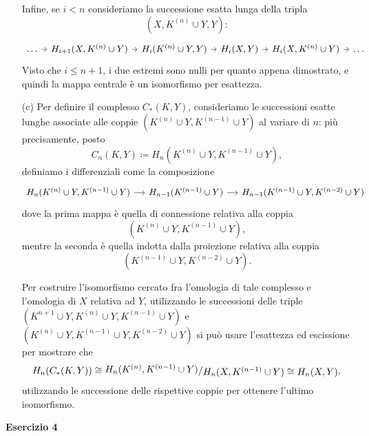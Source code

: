 \documentclass[a4paper]{article}
\newcommand{\ssfrac}[2]{
	\raisebox{+0.3ex}{$#1$}
	/
	\raisebox{-0.3ex}{$#2$}
}
\theoremstyle{definition}
\theoremstyle{definition}
\theoremstyle{remark}
\theoremstyle{definition}
\begin{document}
\begin{itemize}
    Infine, se $i<n$ consideriamo la successione esatta lunga della tripla \[(X,K^{(n)}\cup Y,Y):\]
    \[
        \begin{tikzcd}[column sep=tiny]
            \dots \arrow[r] & H_{i+1}(X,    K^{(n)}\cup Y) \arrow[r] & H_{i}(K^{(n)}\cup Y,Y) \arrow[r] & H_{i}(X,Y) \arrow[r] & H_{i}(X, K^{(n)}\cup Y) \arrow[r] & \dots
        \end{tikzcd}
    \]
    Visto che $i\leq n+1$, i due estremi sono nulli per quanto appena dimostrato, e quindi la mappa centrale è un isomorfismo per esattezza.
\item[(c)] Per definire il complesso $C_*(K,Y)$, consideriamo le successioni esatte lunghe associate alle coppie $(K^{(n)}\cup Y, K^{(n-1)}\cup Y)$ al variare di $n$: più
    precisamente, posto $$C_n(K,Y)\coloneqq H_n(K^{(n)}\cup Y, K^{(n-1)}\cup Y),$$ definiamo i differenziali come la composizione
    \[
        \begin{tikzcd}[column sep=small]
            H_n(K^{(n)}\cup Y, K^{(n-1)}\cup Y) \arrow[r] & H_{n-1}(K^{(n-1)}\cup Y) \arrow[r] & H_{n-1}(K^{(n-1)}\cup Y, K^{(n-2)}\cup Y)
        \end{tikzcd}
    \]
    dove la prima mappa è quella di connessione relativa alla coppia $$(K^{(n)}\cup Y, K^{(n-1)}\cup Y),$$ mentre la seconda è quella indotta dalla proiezione relativa alla coppia
    $$(K^{(n-1)}\cup Y, K^{(n-2)}\cup Y).$$

    Per costruire l'isomorfismo cercato fra l'omologia di tale complesso e l'omologia di $X$ relativa ad $Y$, utilizzando le successioni delle triple $(K^{n+1}\cup Y, K^{(n)}\cup
    Y, K^{(n-1)}\cup Y)$ e $(K^{(n)}\cup Y, K^{(n-1)}\cup Y, K^{(n-2)}\cup Y)$ si può usare l'esattezza ed escissione per mostrare che $$H_n(C_*(K,Y))\cong \ssfrac{H_n(K^{(n)},
    K^{(n-1)}\cup Y)}{H_n(X, K^{(n-1)}\cup Y)\cong H_n(X,Y)},$$ utilizzando le successione delle rispettive coppie per ottenere l'ultimo isomorfismo.
\end{itemize}
\textbf{Esercizio 4}
\end{document}
